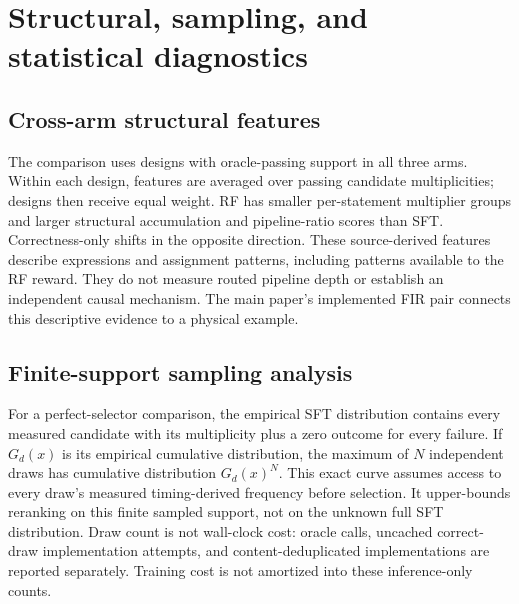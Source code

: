 \section{Structural, sampling, and statistical diagnostics}
\subsection{Cross-arm structural features}

The comparison uses  designs with oracle-passing
support in all three arms. Within each design, features are averaged over
passing candidate multiplicities; designs then receive equal weight. RF has
smaller per-statement multiplier groups and larger structural accumulation and
pipeline-ratio scores than SFT. Correctness-only shifts in the opposite direction.
These source-derived features describe expressions and assignment patterns,
including patterns available to the RF reward. They do not measure routed
pipeline depth or establish an independent causal mechanism. The main paper's
implemented FIR pair connects this descriptive evidence to a physical example.

\subsection{Finite-support sampling analysis}
For a perfect-selector comparison, the empirical SFT distribution contains
every measured candidate with its multiplicity plus a zero outcome for every
failure.  If $G_d(x)$ is its empirical cumulative distribution, the maximum of
$N$ independent draws has cumulative distribution $G_d(x)^N$.  This exact
curve assumes access to every draw's measured timing-derived frequency before
selection.  It upper-bounds reranking on this finite sampled support, not on the
unknown full SFT distribution.  Draw count is not wall-clock cost: oracle calls,
uncached correct-draw implementation attempts, and content-deduplicated
implementations are reported separately.  Training cost is not amortized into
these inference-only counts.

